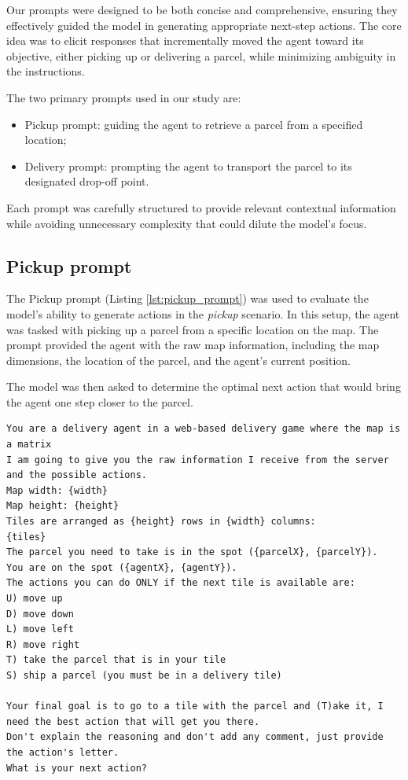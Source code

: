 Our prompts were designed to be both concise and comprehensive, ensuring they effectively
guided the model in generating appropriate next-step actions. The core idea was
to elicit responses that incrementally moved the agent toward its objective, either
picking up or delivering a parcel, while minimizing ambiguity in the
instructions.

The two primary prompts used in our study are:
\begin{itemize}
  \item Pickup prompt: guiding the agent to retrieve a parcel from a specified
    location;

  \item Delivery prompt: prompting the agent to transport the parcel to its
    designated drop-off point.
\end{itemize}

Each prompt was carefully structured to provide relevant contextual information
while avoiding unnecessary complexity that could dilute the model's focus.

\subsection{Pickup prompt}
\label{sub:pickup_prompt}

The Pickup prompt (Listing \ref{lst:pickup_prompt}) was used to evaluate the model's
ability to generate actions in the \emph{pickup} scenario. In this setup, the
agent was tasked with picking up a parcel from a specific location on the map. The
prompt provided the agent with the raw map information, including the map
dimensions, the location of the parcel, and the agent's current position.

The model was then asked to determine the optimal next action that would bring
the agent one step closer to the parcel.

\begin{codewindow}
  [Text]  \begin{lstlisting}
You are a delivery agent in a web-based delivery game where the map is a matrix
I am going to give you the raw information I receive from the server and the possible actions.
Map width: {width}
Map height: {height}
Tiles are arranged as {height} rows in {width} columns:
{tiles}
The parcel you need to take is in the spot ({parcelX}, {parcelY}).
You are on the spot ({agentX}, {agentY}).
The actions you can do ONLY if the next tile is available are:
U) move up
D) move down
L) move left
R) move right
T) take the parcel that is in your tile
S) ship a parcel (you must be in a delivery tile)

Your final goal is to go to a tile with the parcel and (T)ake it, I need the best action that will get you there.
Don't explain the reasoning and don't add any comment, just provide the action's letter.
What is your next action?
\end{lstlisting}
\end{codewindow}

